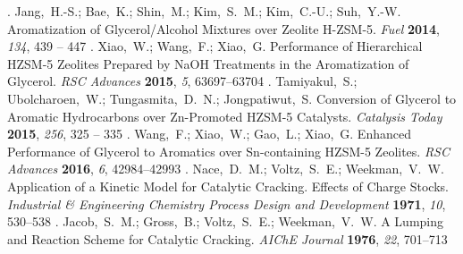 \documentclass[journal=iecred,manuscript=article]{achemso}
\begin{document}
{\begin{mcitethebibliography}
\mciteSetBstMidEndSepPunct{\mcitedefaultmidpunct}
{\mcitedefaultendpunct}{\mcitedefaultseppunct}\relax
\unskip.
Jang,~H.-S.; Bae,~K.; Shin,~M.; Kim,~S.~M.; Kim,~C.-U.; Suh,~Y.-W.
  Aromatization of Glycerol/Alcohol Mixtures over Zeolite H-ZSM-5. \emph{Fuel}
  \textbf{2014}, \emph{134}, 439 -- 447\relax
\mciteBstWouldAddEndPuncttrue
\mciteSetBstMidEndSepPunct{\mcitedefaultmidpunct}
{\mcitedefaultendpunct}{\mcitedefaultseppunct}\relax
\unskip.
Xiao,~W.; Wang,~F.; Xiao,~G. Performance of Hierarchical HZSM-5 Zeolites
  Prepared by NaOH Treatments in the Aromatization of Glycerol. \emph{RSC
  Advances} \textbf{2015}, \emph{5}, 63697--63704\relax
\mciteBstWouldAddEndPuncttrue
\mciteSetBstMidEndSepPunct{\mcitedefaultmidpunct}
{\mcitedefaultendpunct}{\mcitedefaultseppunct}\relax
\unskip.
Tamiyakul,~S.; Ubolcharoen,~W.; Tungasmita,~D.~N.; Jongpatiwut,~S. Conversion
  of Glycerol to Aromatic Hydrocarbons over Zn-Promoted HZSM-5 Catalysts.
  \emph{Catalysis Today} \textbf{2015}, \emph{256}, 325 -- 335\relax
\mciteBstWouldAddEndPuncttrue
\mciteSetBstMidEndSepPunct{\mcitedefaultmidpunct}
{\mcitedefaultendpunct}{\mcitedefaultseppunct}\relax
\unskip.
Wang,~F.; Xiao,~W.; Gao,~L.; Xiao,~G. Enhanced Performance of Glycerol to
  Aromatics over Sn-containing HZSM-5 Zeolites. \emph{RSC Advances}
  \textbf{2016}, \emph{6}, 42984--42993\relax
\mciteBstWouldAddEndPuncttrue
\mciteSetBstMidEndSepPunct{\mcitedefaultmidpunct}
{\mcitedefaultendpunct}{\mcitedefaultseppunct}\relax
\unskip.
Nace,~D.~M.; Voltz,~S.~E.; Weekman,~V.~W. Application of a Kinetic Model for
  Catalytic Cracking. Effects of Charge Stocks. \emph{Industrial \& Engineering
  Chemistry Process Design and Development} \textbf{1971}, \emph{10},
  530--538\relax
\mciteBstWouldAddEndPuncttrue
\mciteSetBstMidEndSepPunct{\mcitedefaultmidpunct}
{\mcitedefaultendpunct}{\mcitedefaultseppunct}\relax
\unskip.
Jacob,~S.~M.; Gross,~B.; Voltz,~S.~E.; Weekman,~V.~W. A Lumping and Reaction
  Scheme for Catalytic Cracking. \emph{AIChE Journal} \textbf{1976}, \emph{22},
  701--713\relax
\mciteBstWouldAddEndPuncttrue
\mciteSetBstMidEndSepPunct{\mcitedefaultmidpunct}

\end{mcitethebibliography}}
\end{document}
